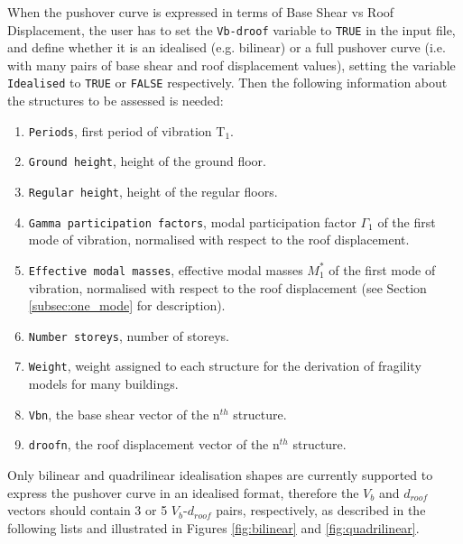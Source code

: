 When the pushover curve is expressed in terms of Base Shear vs Roof Displacement, the user has to set the \verb=Vb-droof= variable to \verb=TRUE= in the input file, and define whether it is an idealised (e.g. bilinear) or a full pushover curve (i.e. with many pairs of base shear and roof displacement values), setting the variable \verb=Idealised= to \verb=TRUE= or \verb=FALSE= respectively. Then the following information about the structures to be assessed is needed:\\

\begin{enumerate}
\item \verb=Periods=, first period of vibration T$_1$.
\item \verb=Ground height=, height of the ground floor.
\item \verb=Regular height=, height of the regular floors.
\item \verb=Gamma participation factors=, modal participation factor $\Gamma_1$ of the first mode of vibration, normalised with respect to the roof displacement.
\item \verb=Effective modal masses=, effective modal masses $M_{1}^{*}$ of the first mode of vibration, normalised with respect to the roof displacement (see Section \ref{subsec:one_mode} for description).
\item \verb=Number storeys=, number of storeys.
\item \verb=Weight=, weight assigned to each structure for the derivation of fragility models for many buildings.
\item \verb=Vbn=, the base shear vector of the n$^{th}$ structure.
\item \verb=droofn=, the roof displacement vector of the n$^{th}$ structure. \\
\end{enumerate}

Only bilinear and quadrilinear idealisation shapes are currently supported to express the pushover curve in an idealised format, therefore the $V_b$ and $d_{roof}$ vectors should contain 3 or 5 $V_b$-$d_{roof}$ pairs, respectively, as described in the following lists and illustrated in Figures \ref{fig:bilinear} and \ref{fig:quadrilinear}.\\

